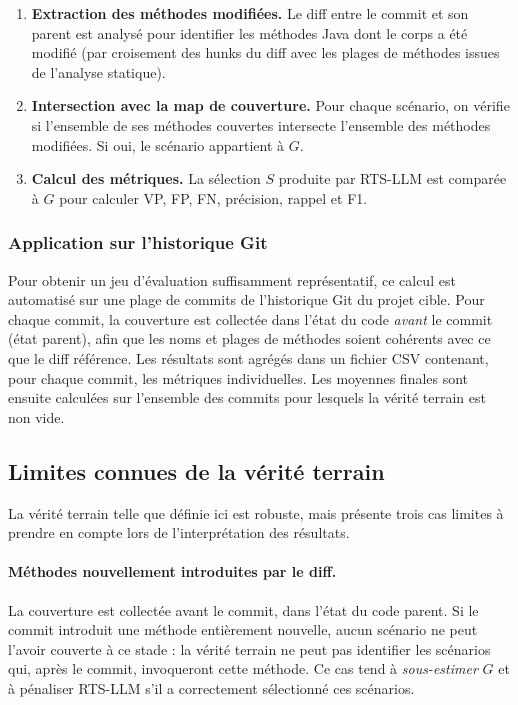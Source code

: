 \documentclass[12pt,a4paper]{article}
\begin{document}
\begin{enumerate}[noitemsep]
  \item \textbf{Extraction des méthodes modifiées.} Le diff entre le
        commit et son parent est analysé pour identifier les méthodes
        Java dont le corps a été modifié (par croisement des hunks du
        diff avec les plages de méthodes issues de l'analyse statique).

  \item \textbf{Intersection avec la map de couverture.} Pour chaque
        scénario, on vérifie si l'ensemble de ses méthodes couvertes
        intersecte l'ensemble des méthodes modifiées. Si oui, le scénario
        appartient à $G$.

  \item \textbf{Calcul des métriques.} La sélection $S$ produite par
        RTS-LLM est comparée à $G$ pour calculer VP, FP, FN, précision,
        rappel et F1.
\end{enumerate}

\subsubsection{Application sur l'historique Git}

Pour obtenir un jeu d'évaluation suffisamment représentatif, ce calcul
est automatisé sur une plage de commits de l'historique Git du projet
cible. Pour chaque commit, la couverture est collectée dans l'état du
code \emph{avant} le commit (état parent), afin que les noms et plages
de méthodes soient cohérents avec ce que le diff référence. Les résultats
sont agrégés dans un fichier CSV contenant, pour chaque commit, les
métriques individuelles. Les moyennes finales sont ensuite calculées
sur l'ensemble des commits pour lesquels la vérité terrain est non vide.

\subsection{Limites connues de la vérité terrain}

La vérité terrain telle que définie ici est robuste, mais présente trois
cas limites à prendre en compte lors de l'interprétation des résultats.

\paragraph{Méthodes nouvellement introduites par le diff.}
La couverture est collectée avant le commit, dans l'état du code parent.
Si le commit introduit une méthode entièrement nouvelle, aucun scénario
ne peut l'avoir couverte à ce stade : la vérité terrain ne peut pas
identifier les scénarios qui, après le commit, invoqueront cette méthode.
Ce cas tend à \emph{sous-estimer} $G$ et à pénaliser RTS-LLM s'il a
correctement sélectionné ces scénarios.
\end{document}

